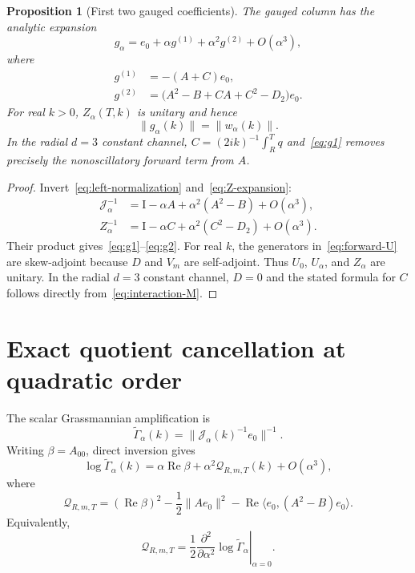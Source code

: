 \documentclass[11pt]{article}
\newcommand{\Id}{\mathrm I}
\newcommand{\cQ}{\mathcal Q}
\newcommand{\cJ}{\mathcal J}
\DeclareMathOperator{\Rea}{Re}
\newtheorem{proposition}{Proposition}[section]
\theoremstyle{definition}
\begin{document}
\begin{proposition}[First two gauged coefficients]
\label{prop:gauged-expansion}
The gauged column has the analytic expansion
\begin{equation}
 g_\alpha=e_0+\alpha g^{(1)}+\alpha^2g^{(2)}+O(\alpha^3),
\end{equation}
where
\begin{align}
 g^{(1)}&=-(A+C)e_0,\label{eq:g1}\\
 g^{(2)}&=\bigl(A^2-B+CA+C^2-D_2\bigr)e_0.
 \label{eq:g2}
\end{align}
For real $k>0$, $Z_\alpha(T,k)$ is unitary and hence
\begin{equation}
 \|g_\alpha(k)\|=\|w_\alpha(k)\|.
 \label{eq:gauge-norm-invariance}
\end{equation}
In the radial $d=3$ constant channel, $C=(2ik)^{-1}\int_R^Tq$ and~\eqref{eq:g1} removes precisely the nonoscillatory forward term from $A$.
\end{proposition}

\begin{proof}
Invert~\eqref{eq:left-normalization} and~\eqref{eq:Z-expansion}:
\begin{align}
 \cJ_\alpha^{-1}
 &=\Id-\alpha A+\alpha^2(A^2-B)+O(\alpha^3),\\
 Z_\alpha^{-1}
 &=\Id-\alpha C+\alpha^2(C^2-D_2)+O(\alpha^3).
\end{align}
Their product gives~\eqref{eq:g1}--\eqref{eq:g2}.  For real $k$, the generators in~\eqref{eq:forward-U} are skew-adjoint because $D$ and $V_m$ are self-adjoint.  Thus $U_0$, $U_\alpha$, and $Z_\alpha$ are unitary.  In the radial $d=3$ constant channel, $D=0$ and the stated formula for $C$ follows directly from~\eqref{eq:interaction-M}.
\end{proof}

\section{Exact quotient cancellation at quadratic order}

The scalar Grassmannian amplification is
\begin{equation}
 \widetilde\Gamma_\alpha(k)=\|\cJ_\alpha(k)^{-1}e_0\|^{-1}.
\end{equation}
Writing $\beta=A_{00}$, direct inversion gives
\begin{equation}
 \log\widetilde\Gamma_\alpha(k)
 =\alpha\Rea\beta+\alpha^2\cQ_{R,m,T}(k)+O(\alpha^3),
 \label{eq:log-expansion}
\end{equation}
where
\begin{equation}
 \cQ_{R,m,T}
 =(\Rea\beta)^2-\frac12\|Ae_0\|^2
 -\Rea\langle e_0,(A^2-B)e_0\rangle.
 \label{eq:Q-original}
\end{equation}
Equivalently,
\begin{equation}
 \cQ_{R,m,T}
 =\frac12\left.\frac{\partial^2}{\partial\alpha^2}
 \log\widetilde\Gamma_\alpha\right|_{\alpha=0}.
 \label{eq:second-variation}
\end{equation}
\end{document}
